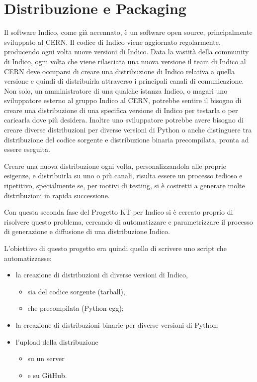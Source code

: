 \chapter{Distribuzione e Packaging} \label{chap:distribuzione_packaging}

    Il software Indico, come già accennato, è un software open source, principalmente sviluppato al \ac{CERN}. Il codice di Indico viene aggiornato regolarmente, producendo ogni volta nuove versioni di Indico. Data la vastità della community di Indico, ogni volta che viene rilasciata una nuova versione il team di Indico al \ac{CERN} deve occuparsi di creare una distribuzione di Indico relativa a quella versione e quindi di distribuirla attraverso i principali canali di comunicazione. Non solo, un amministratore di una qualche istanza Indico, o magari uno sviluppatore esterno al gruppo Indico al \ac{CERN}, potrebbe sentire il bisogno di creare una distribuzione di una specifica versione di Indico per testarla o per caricarla dove più desidera. Inoltre uno sviluppatore potrebbe avere bisogno di creare diverse distribuzioni per diverse versioni di Python o anche distinguere tra distribuzione del codice sorgente e distribuzione binaria precompilata, pronta ad essere eseguita.
    
    Creare una nuova distribuzione ogni volta, personalizzandola alle proprie esigenze, e distribuirla su uno o più canali, risulta essere un processo tedioso e ripetitivo, specialmente se, per motivi di testing, si è costretti a generare molte distribuzioni in rapida successione.
    
    Con questa seconda fase del Progetto KT per Indico si è cercato proprio di risolvere questo problema, cercando di automatizzare e parametrizzare il processo di generazione e diffusione di una distribuzione Indico.
    
    L'obiettivo di questo progetto era quindi quello di scrivere uno script che automatizzasse:
    
    \begin{itemize}
        \item la creazione di distribuzioni di diverse versioni di Indico,
        \begin{itemize}
            \item sia del codice sorgente (tarball),
            \item che precompilata (Python egg);
        \end{itemize}
        \item la creazione di distribuzioni binarie per diverse versioni di Python;
        \item l'upload della distribuzione
        \begin{itemize}
            \item su un server
            \item e su GitHub.
        \end{itemize}
    \end{itemize}
    
